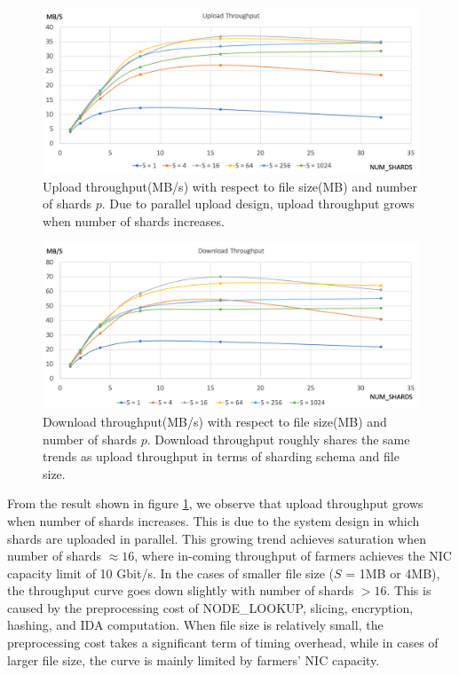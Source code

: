 \begin{figure}[hbt]
\centering
  \includegraphics[width=14cm]{charts/chart_upload_throughput.png}
  \caption[Upload throughput with respect to file size and number of shards]{Upload throughput(MB/s) with respect to file size(MB) and number of shards $p$. Due to parallel upload design, upload throughput grows when number of shards increases.}
  \label{fig:uploadthroughput}
\end{figure}

\begin{figure}[hbt]
\centering
  \includegraphics[width=14cm]{charts/chart_download_throughput.png}
  \caption[Download throughput with respect to file size and number of shards]{Download throughput(MB/s) with respect to file size(MB) and number of shards $p$. Download throughput roughly shares the same trends as upload throughput in terms of sharding schema and file size.}
  \label{fig:downloadthroughput}
\end{figure}

From the result shown in figure \ref{fig:uploadthroughput}, we observe that upload throughput grows when number of shards increases. This is due to the system design in which shards are uploaded in parallel. This growing trend achieves saturation when number of shards $\approx 16$, where in-coming throughput of farmers achieves the NIC capacity limit of 10 Gbit/s. In the cases of smaller file size ($S$ = 1MB or 4MB), the throughput curve goes down slightly with number of shards $> 16$. This is caused by the preprocessing cost of NODE\_LOOKUP, slicing, encryption, hashing, and IDA computation. When file size is relatively small, the preprocessing cost takes a significant term of timing overhead, while in cases of larger file size, the curve is mainly limited by farmers' NIC capacity.

